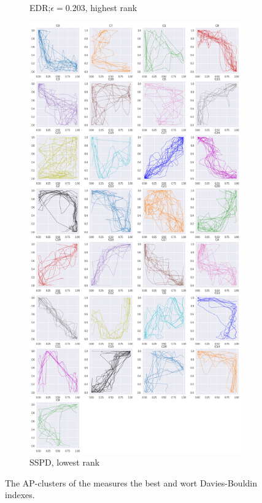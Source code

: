 \begin{figure}[h!]
\begin{subfigure}[c]{0.37\linewidth}
    \caption{EDR;$\epsilon=0.203$, highest rank}
  \end{subfigure}
  \hfill
  \begin{subfigure}[c]{0.37\linewidth}
    \includegraphics[width=\linewidth]{figs/clusters/CLU_AP_ALL[SSPD].png}
    \caption{SSPD, lowest rank}
  \end{subfigure}
  \caption{The AP-clusters of the measures the best and wort Davies-Bouldin indexes.}
  \label{fig:cluster-best-worst-db-ap}
\end{figure}

